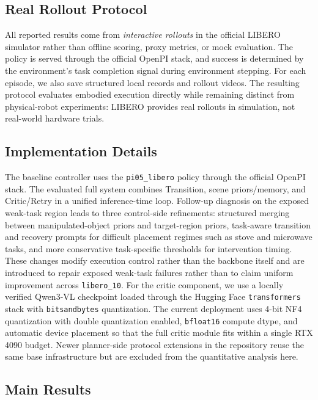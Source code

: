\documentclass[a4paper]{Template/LaTeX_Templates/waica}
\begin{document}
\subsection{Real Rollout Protocol}

All reported results come from \emph{interactive rollouts} in the official LIBERO simulator rather than offline scoring, proxy metrics, or mock evaluation. The policy is served through the official OpenPI stack, and success is determined by the environment's task completion signal during environment stepping. For each episode, we also save structured local records and rollout videos. The resulting protocol evaluates embodied execution directly while remaining distinct from physical-robot experiments: LIBERO provides real rollouts in simulation, not real-world hardware trials.

\subsection{Implementation Details}

The baseline controller uses the \texttt{pi05\_libero} policy through the official OpenPI stack. The evaluated full system combines Transition, scene priors/memory, and Critic/Retry in a unified inference-time loop. Follow-up diagnosis on the exposed weak-task region leads to three control-side refinements: structured merging between manipulated-object priors and target-region priors, task-aware transition and recovery prompts for difficult placement regimes such as stove and microwave tasks, and more conservative task-specific thresholds for intervention timing. These changes modify execution control rather than the backbone itself and are introduced to repair exposed weak-task failures rather than to claim uniform improvement across \texttt{libero\_10}. For the critic component, we use a locally verified Qwen3-VL checkpoint loaded through the Hugging Face \texttt{transformers} stack with \texttt{bitsandbytes} quantization. The current deployment uses 4-bit NF4 quantization with double quantization enabled, \texttt{bfloat16} compute dtype, and automatic device placement so that the full critic module fits within a single RTX 4090 budget. Newer planner-side protocol extensions in the repository reuse the same base infrastructure but are excluded from the quantitative analysis here.

\subsection{Main Results}
\end{document}
